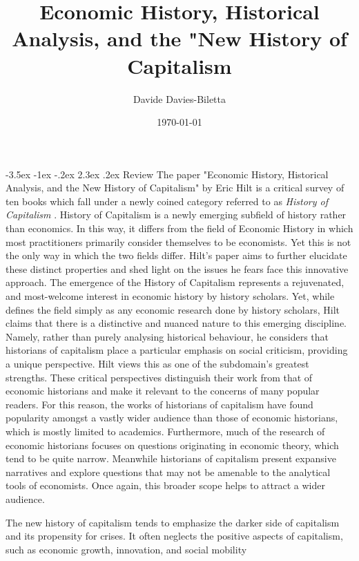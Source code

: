\documentclass[11pt]{article}
\title{ Economic History, Historical Analysis, and the "New History of Capitalism }
\author{Davide Davies-Biletta}
\date{\today}
\makeatletter
\newcommand{\bb}{\bigbreak\noindent}
\renewcommand\section{\leftskip 0pt\@startsection {section}{1}{\z@}%
	{-3.5ex \@plus -1ex \@minus -.2ex}%
	{2.3ex \@plus.2ex}%
	{\normalfont\Large\bfseries}}
\makeatother
\begin{document}
	\maketitle
	\setcounter{page}{1}
	\begin{spacing}{1.7}
		\section{Review}
		The paper "Economic History, Historical Analysis, and the New History of Capitalism" by Eric Hilt is a critical survey of ten books which fall under a newly coined category referred to as \textit{History of Capitalism} \parencite{hilt2017economic}. History of Capitalism is a newly emerging subfield of history rather than economics. In this way, it differs from the field of Economic History in which most practitioners primarily consider themselves to be economists. Yet this is not the only way in which the two fields differ. Hilt's paper aims to further elucidate these distinct properties and shed light on the issues he fears face this innovative approach.
		\bb
		The emergence of the History of Capitalism represents a rejuvenated, and most-welcome interest in economic history by history scholars. Yet, while \cite{beckert2012history} defines the field simply as any economic research done by history scholars, Hilt claims that there is a distinctive and nuanced nature to this emerging discipline. Namely, rather than purely analysing historical behaviour, he considers that historians of capitalism place a particular emphasis on social criticism, providing a unique perspective. Hilt views this as one of the subdomain's greatest strengths. These critical perspectives distinguish their work from that of economic historians and make it relevant to the concerns of many popular readers. For this reason, the works of historians of capitalism have found popularity amongst a vastly wider audience than those of economic historians, which is mostly limited to academics. Furthermore, much of the research of economic historians focuses on questions originating in economic theory, which tend to be quite narrow. Meanwhile historians of capitalism present expansive narratives and explore questions that may not be amenable to the analytical tools of economists. Once again, this broader scope helps to attract a wider audience. 
		
		The new history of capitalism tends to emphasize the darker side of capitalism and its propensity for crises. It often neglects the positive aspects of capitalism, such as economic growth, innovation, and social mobility
		

\end{spacing}
\end{document}
